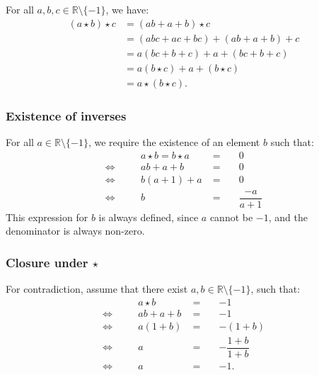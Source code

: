 \documentclass[11pt]{article}
\newcommand{\R}{\mathbb{R}}
\theoremstyle{definition}
\theoremstyle{plain}
\theoremstyle{remark}
\begin{document}
\begin{enumerate}
          For all \(a, b, c \in \R \setminus \{-1\}\), we have:
          \[
              \begin{aligned}
                  (a \star b) \star c & = (ab + a + b) \star c               \\
                                      & = (abc + ac + bc) + (ab + a + b) + c \\
                                      & = a (bc + b + c) + a + (bc + b + c)  \\
                                      & = a (b \star c) + a + (b \star c)    \\
                                      & = a \star (b \star c).
              \end{aligned}
          \]

          \subsubsection*{Existence of inverses}

          For all \(a \in \R \setminus \{-1\}\), we require the existence of an element \(b\) such that:
          \[
              \begin{alignedat}{3}
                            &  & a \star b = b \star a & \; =\; &  & 0                 \\
                  \iff\quad &  & ab + a + b            & \; =\; &  & 0                 \\
                  \iff\quad &  & b(a + 1) + a          & \; =\; &  & 0                 \\
                  \iff\quad &  & b                     & \; =\; &  & \dfrac{-a}{a + 1}
              \end{alignedat}
          \]
          This expression for \(b\) is always defined, since \(a\) cannot be \(-1\), and the denominator is always non-zero.

          \subsubsection*{Closure under \(\star\)}

          For contradiction, assume that there exist \(a, b \in \R \setminus \{-1\}\), such that:
          \[
              \begin{alignedat}{3}
                            &  & a \star b  & \; = \; &  & -1                    \\
                  \iff\quad &  & ab + a + b & \; = \; &  & -1                    \\
                  \iff\quad &  & a (1 + b)  & \; = \; &  & - (1 + b)             \\
                  \iff\quad &  & a          & \; = \; &  & -\dfrac{1 + b}{1 + b} \\
                  \iff\quad &  & a          & \; = \; &  & -1.                   \\
              \end{alignedat}
          \]


\end{enumerate}
\end{document}
